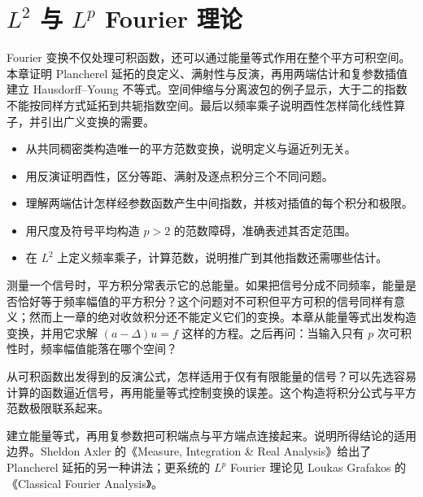 \chapter{\texorpdfstring{\(L^2\)}{L²} 与 \texorpdfstring{\(L^p\)}{Lᵖ} Fourier 理论}
\label{b2:ch:04}
\begin{chapterabstract}
Fourier 变换不仅处理可积函数，还可以通过能量等式作用在整个平方可积空间。本章证明 Plancherel 延拓的良定义、满射性与反演，再用两端估计和复参数插值建立 Hausdorff--Young 不等式。空间伸缩与分离波包的例子显示，大于二的指数不能按同样方式延拓到共轭指数空间。最后以频率乘子说明酉性怎样简化线性算子，并引出广义变换的需要。
\end{chapterabstract}
\begin{learninggoals}
\begin{itemize}
\item\label{b2:item:04-goal-extension}从共同稠密类构造唯一的平方范数变换，说明定义与逼近列无关。
\item\label{b2:item:04-goal-unitary}用反演证明酉性，区分等距、满射及逐点积分三个不同问题。
\item\label{b2:item:04-goal-interpolation}理解两端估计怎样经参数函数产生中间指数，并核对插值的每个积分和极限。
\item\label{b2:item:04-goal-failure}用尺度及符号平均构造 \(p>2\) 的范数障碍，准确表述其否定范围。
\item\label{b2:item:04-goal-multiplier}在 \(L^2\) 上定义频率乘子，计算范数，说明推广到其他指数还需哪些估计。
\end{itemize}
\end{learninggoals}

测量一个信号时，平方积分常表示它的总能量。如果把信号分成不同频率，能量是否恰好等于频率幅值的平方积分？这个问题对不可积但平方可积的信号同样有意义；然而上一章的绝对收敛积分还不能定义它们的变换。本章从能量等式出发构造变换，并用它求解 \((a-\Delta)u=f\) 这样的方程。之后再问：当输入只有 \(p\) 次可积性时，频率幅值能落在哪个空间？

\ProseParagraphBreak

从可积函数出发得到的反演公式，怎样适用于仅有有限能量的信号？可以先选容易计算的函数逼近信号，再用能量等式控制变换的误差。这个构造将积分公式与平方范数极限联系起来。

\ProseParagraphBreak

建立能量等式，再用复参数把可积端点与平方端点连接起来。说明所得结论的适用边界。Sheldon Axler 的《Measure, Integration \& Real Analysis》\cite[Section 11C, pp. 375--377]{Axler2020Measure}给出了 Plancherel 延拓的另一种讲法；更系统的 \(L^p\) Fourier 理论见 Loukas Grafakos 的《Classical Fourier Analysis》\cite{Grafakos2014Classical}。

